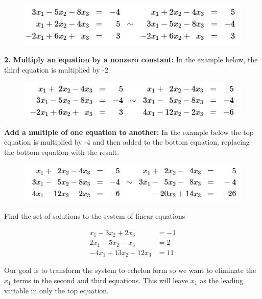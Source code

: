        \begin{figure}[hbt!]
            \centering
            \includegraphics[scale = 0.75]{Assets/1_Transformation}
        \end{figure}

        \textbf{2. Multiply an equation by a nonzero constant:} In the example below, the third equation is multiplied by -2

        \begin{figure}[hbt!]
            \centering
            \includegraphics[scale = 0.75]{Assets/1_Transformation2}
        \end{figure}

        \textbf{Add a multiple of one equation to another:} In the example below the top equation is multiplied by -4 and then added to the bottom equation, replacing the bottom equation with the result.

        \begin{figure}[hbt!]
            \centering
            \includegraphics[scale = 0.75]{Assets/1_Transformation3}
        \end{figure}

        \textit{} Find the set of solutions to the system of linear equations

        \begin{align*}
            x_1 - 3x_2 + 2x_3   &= -1 \\
            2x_1 - 5x_2 - x_3   &= 2 \\
            -4x_1 + 13x_2 - 12x_3   &= 11
        \end{align*}

        Our goal is to transform the system to echelon form so we want to eliminate the $x_1$ terms in the second and third equations. This will leave $x_1$ as the leading variable in only the top equation. \\

